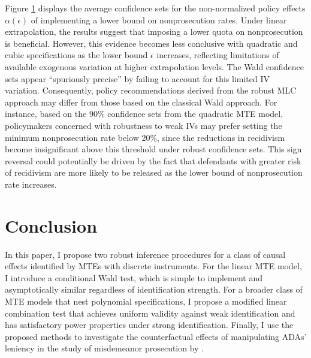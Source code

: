 \documentclass[11pt]{article}
\theoremstyle{definition}
\newcommand{\0}{\ensuremath{\mathbf{0}}}
\begin{document}
\begin{bibunit}
\begin{figure}[h!]
\label{fig:quota_level_average}

\end{figure}

%
%
%
%
%
%
%
%

Figure \ref{fig:quota_level_average} displays the average confidence sets for the non-normalized policy effects $\alpha(\epsilon)$ of implementing a lower bound on nonprosecution rates. Under linear extrapolation, the results suggest that imposing a lower quota on nonprosecution is beneficial. However, this evidence becomes less conclusive with quadratic and cubic specifications as the lower bound ${\epsilon}$ increases, reflecting limitations of available exogenous variation at higher extrapolation levels. The Wald confidence sets appear ``spuriously precise'' by failing to account for this limited IV variation. Consequently, policy recommendations derived from the robust MLC approach may differ from those based on the classical Wald approach. For instance, based on the 90\% confidence sets from the quadratic MTE model, policymakers concerned with robustness to weak IVs may prefer setting the minimum nonprosecution rate below 20\%, since the reductions in recidivism become insignificant above this threshold under robust confidence sets. This sign reversal could potentially be driven by the fact that defendants with greater risk of recidivism are more likely to be released as the lower bound of nonprosecution rate increases.


%

%


%
%
%

%

%
%
%
%
%
%
%
%
%
%
%
%
%
%
%
%
%
%
%
%
%
%
%
%
%
%
%
%
%
%

%
%
%
%
%
%
%
%
%
%
%
%
%
%
%
%
%
%
%
%
%
%
%
%

%
%

%
%
%
%
%
%
%
%
%
%
%
%
%
%
%
%


\section{Conclusion}
\label{sec:conclusion}
In this paper, I propose two robust inference procedures for a class of causal effects identified by MTEs with discrete instruments. For the linear MTE model, I introduce a conditional Wald test, which is simple to implement and asymptotically similar regardless of identification strength. For a broader class of MTE models that nest polynomial specifications, I propose a modified linear combination test that achieves uniform validity against weak identification and has satisfactory power properties under strong identification. Finally, I use the proposed methods to investigate the counterfactual effects of manipulating ADAs' leniency in the study of misdemeanor prosecution by \cite{agan/doleac/harvey:2023}.


\end{bibunit}
\end{document}
